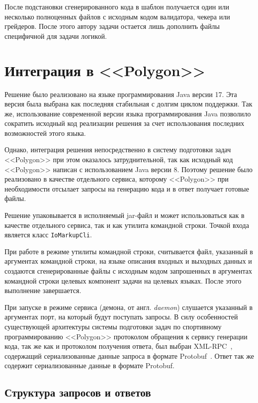 \documentclass[times,specification,annotation]{style/itmo-student-thesis/itmo-student-thesis}
\begin{document}
После подстановки сгенерированного кода в шаблон получается один или несколько полноценных файлов с исходным кодом валидатора, чекера или грейдеров. После этого автору задачи остается лишь дополнить файлы специфичной для задачи логикой.

\section{Интеграция в <<Polygon>>}

Решение было реализовано на языке программирования Java версии 17. Эта версия была выбрана как последняя стабильная с долгим циклом поддержки. Так же, использование современной версии языка программирования Java позволило сократить исходный код реализации решения за счет использования последних возможностей этого языка.

Однако, интеграция решения непосредственно в систему подготовки задач <<Polygon>> при этом оказалось затруднительной, так как исходный код <<Polygon>> написан с использованием Java версии 8. Поэтому решение было реализовано в качестве отдельного сервиса, которому <<Polygon>> при необходимости отсылает запросы на генерацию кода и в ответ получает готовые файлы.

Решение упаковывается в исполняемый jar-файл и может использоваться как в качестве отдельного сервиса, так и как утилита командной строки. Точкой входа является класс \texttt{IoMarkupCli}.

При работе в режиме утилиты командной строки, считывается файл, указанный в аргументах командной строки, на языке описания входных и выходных данных и создаются сгенерированные файлы с исходным кодом запрошенных в аргументах командной строки целевых компонент задачи на целевых языках. После этого выполнение завершается.

При запуске в режиме сервиса (демона, от англ. \textit{daemon}) слушается указанный в аргументах порт, на который будут поступать запросы. В силу особенностей существующей архитектуры системы подготовки задач по спортивному программированию <<Polygon>> протоколом обращения к сервису генерации кода, так же как и протоколом получения ответа, был выбран XML-RPC~\cite{laurent2001programming}, содержащий сериализованные данные запроса в формате Protobuf~\cite{protobufdocs}. Ответ так же содержит сериализованные данные в формате Protobuf.

\subsection{Структура запросов и ответов}
\end{document}
